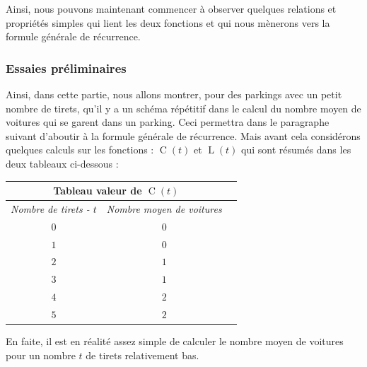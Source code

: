 \documentclass[a4paper,francais,11pt]{article}
\begin{document}
Ainsi, nous pouvons maintenant commencer à observer quelques relations et propriétés simples qui lient les deux fonctions et qui nous mènerons vers la formule générale de récurrence.
\subsubsection{Essaies préliminaires}
Ainsi, dans cette partie, nous allons montrer, pour des parkings avec un petit nombre de tirets, qu'il y a un schéma répétitif dans le calcul du nombre moyen de voitures qui se garent dans un parking. Ceci permettra dans le paragraphe suivant d'aboutir à la formule générale de récurrence. Mais avant cela considérons quelques calculs sur les fonctions : $\operatorname{C}\left(t\right)$ et $\operatorname{L}\left(t\right)$ qui sont résumés dans les deux tableaux ci-dessous :
\begin{center}
\begin{tabular}{|c||c|c|}
    \hline
    \multicolumn{2}{|c|}{\textbf{Tableau valeur de $\operatorname{C}\left(t\right)$}} \\ \hline\hline
        \multirow{1}{*}{\emph{Nombre de tirets - $t$}} & \emph{Nombre moyen de voitures} \\ \hline\hline
        \multirow{1}{*}{$0$} & $0$ \\ \hline
        \multirow{1}{*}{$1$} & $0$ \\ \hline
        \multirow{1}{*}{$2$} & $1$ \\ \hline
        \multirow{1}{*}{$3$} & $1$ \\ \hline
        \multirow{1}{*}{$4$} & $2$\\ \hline
        \multirow{1}{*}{$5$} & $2$ \\
    \hline
\end{tabular}
\end{center}

En faite, il est en réalité assez simple de calculer le nombre moyen de voitures pour un nombre $t$ de tirets relativement bas.
\end{document}
